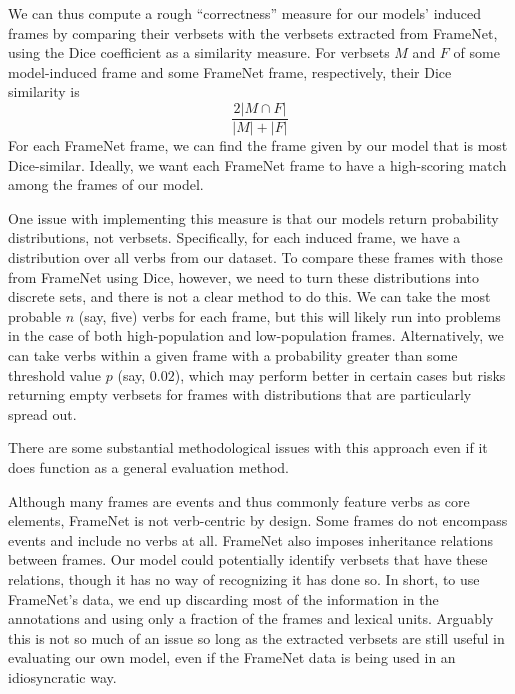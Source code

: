 \documentclass{article} %
\begin{document}
We can thus compute a rough ``correctness'' measure for our models' induced frames by comparing their verbsets with the verbsets extracted from FrameNet, using the Dice coefficient as a similarity measure. For verbsets $M$ and $F$ of some model-induced frame and some FrameNet frame, respectively, their Dice similarity is \[\frac{2|M\cap F|}{|M|+|F|}\]
For each FrameNet frame, we can find the frame given by our model that is most Dice-similar.
Ideally, we want each FrameNet frame to have a high-scoring match among the frames of our model.

One issue with implementing this measure is that our models return probability distributions, not verbsets. Specifically, for each induced frame, we have a distribution over all verbs from our dataset. To compare these frames with those from FrameNet using Dice, however, we need to turn these distributions into discrete sets, and there is not a clear method to do this.
We can take the most probable $n$ (say, five) verbs for each frame, but this will likely run into problems in the case of both high-population and low-population frames. Alternatively, we can take verbs within a given frame with a probability greater than some threshold value $p$ (say, $0.02$), which may perform better in certain cases but risks returning empty verbsets for frames with distributions that are particularly spread out.




There are some substantial methodological issues with this approach even if it does function as a general evaluation method. 

Although many frames are events and thus commonly feature verbs as core elements, FrameNet is not verb-centric by design. Some frames do not encompass events and include no verbs at all.
FrameNet also imposes inheritance relations between frames. Our model could potentially identify verbsets that have these relations, though it has no way of recognizing it has done so.
In short, to use FrameNet's data, we end up discarding most of the information in the annotations and using only a fraction of the frames and lexical units. Arguably this is not so much of an issue so long as the extracted verbsets are still useful in evaluating our own model, even if the FrameNet data is being used in an idiosyncratic way.
\end{document}

